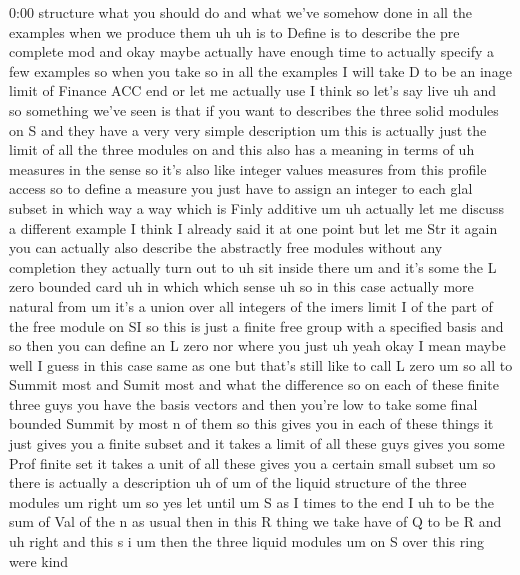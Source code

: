 \begin{unfinished}{0:00}
structure  what  you  should  do  and  what
we've  somehow  done  in  all  the  examples
when  we  produce  them  uh  uh  is  to  Define
is  to  describe  the  pre  complete
mod  and  okay  maybe
actually  have  enough  time  to  actually
specify  a  few
examples  so  when  you  take
so  in  all  the  examples  I  will  take  D  to
be  an  inage  limit  of  Finance  ACC  end  or
let  me  actually  use  I
think
so  let's  say  live
uh  and  so  something  we've  seen  is  that
if  you  want  to  describes  the  three  solid
modules  on  S  and  they  have  a  very  very
simple
description  um
this  is  actually  just  the  limit  of  all
the  three  modules
on  and  this  also  has  a  meaning  in  terms
of  uh  measures  in  the  sense  so  it's
also  like  integer  values  measures  from
this  profile
access  so  to  define  a  measure  you  just
have  to  assign  an  integer  to  each  glal
subset  in  which  way  a  way  which  is  Finly
additive  um
uh  actually  let  me  discuss  a  different
example  I  think  I  already  said  it  at  one
point  but  let  me  Str  it  again  you  can
actually  also  describe  the  abstractly
free  modules  without  any
completion  they  actually  turn  out  to  uh
sit  inside  there  um  and  it's  some  the  L
zero  bounded
card
uh  in  which  which  sense
uh  so  in  this  case  actually  more  natural
from  um  it's  a  union  over  all
integers  of  the  imers
limit  I  of  the  part  of  the  free  module
on  SI  so  this  is  just  a  finite  free
group  with  a  specified  basis
and  so  then  you  can  define  an  L  zero
nor  where  you
just
uh  yeah  okay  I  mean
maybe  well  I  guess  in  this  case  same  as
one  but  that's  still  like  to  call  L  zero
um  so  all  to  Summit  most  and  Sumit  most
and
what  the
difference  so  on  each  of  these  finite
three  guys  you  have  the  basis  vectors
and  then  you're  low  to  take  some  final
bounded  Summit  by  most  n  of  them
so  this  gives  you  in  each  of  these
things  it  just  gives  you  a  finite  subset
and  it  takes  a  limit  of  all  these  guys
gives  you  some  Prof  finite  set  it  takes
a  unit  of  all  these  gives  you  a  certain
small
subset
um  so  there  is  actually  a
description  uh
of
um  of  the  liquid  structure  of  the  three
modules
um
right
um  so
yes  let
until
um
S  as  I  times  to  the
end  I
uh  to
be  the  sum  of  Val  of  the  n  as  usual  then
in  this  R  thing  we  take  have  of  Q  to  be
R  and  uh  right  and  this  s
i
um
then  the
three  liquid
modules  um  on  S  over  this  ring  were  kind

\end{unfinished}
